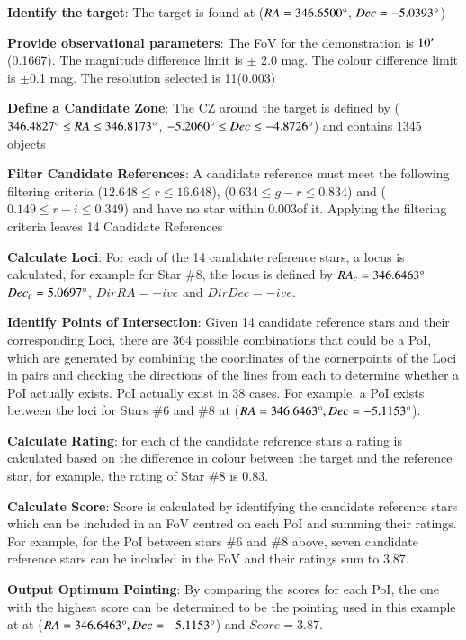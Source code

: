 \documentclass{aa}
\begin{document}
\textbf{Identify the target}: The target is found at (${RA = 346.6500\degree}$, ${Dec =-5.0393\degree}$)

\textbf{Provide observational parameters}: The FoV for the demonstration is $10^\prime$ (0.1667\textdegree). The magnitude difference limit is $\pm$ 2.0 mag. The colour difference limit is $\pm$0.1 mag. The resolution selected is 11\arcsec (0.003\textdegree)

\textbf{Define a Candidate Zone}: The CZ around the target is defined by (${346.4827\degree \leq RA \leq 346.8173\degree{}}$, ${-5.2060\degree \leq Dec \leq -4.8726\degree}$) and contains 1345 objects

\textbf{Filter Candidate References}: A candidate reference must meet the following filtering criteria (${12.648 \leq r \leq 16.648}$), (${0.634 \leq g-r \leq 0.834}$) and (${0.149 \leq r-i \leq 0.349}$) and have no star within 0.003\textdegree of it. Applying the filtering criteria leaves 14 Candidate References

\textbf{Calculate Loci}: For each of the 14 candidate reference stars, a locus is calculated, for example for Star \#{}8, the locus is defined by ${RA_c=346.6463\degree{}}$ ${Dec_c=5.0697\degree{}}$, ${DirRA = -ive}$ and ${DirDec = -ive}$.

\textbf{Identify Points of Intersection}: Given 14 candidate reference stars and their corresponding Loci, there are 364 possible combinations that could be a PoI, which are generated by combining the coordinates of the cornerpoints of the Loci in pairs and checking the directions of the lines from each to determine whether a PoI actually exists.  PoI actually exist in 38 cases. For example, a PoI exists between the loci for Stars \#{}6 and \#{}8 at (${RA=346.6463\degree}, {Dec = -5.1153\degree}$).

\textbf{Calculate Rating}: for each of the candidate reference stars a rating is calculated based on the difference in colour between the target and the reference star, for example, the rating of Star \#{}8 is 0.83.

\textbf{Calculate Score}: Score is calculated by identifying the candidate reference stars which can be included in an FoV centred on each PoI and summing their ratings. For example, for the PoI between stars \#{}6 and \#{}8 above, seven candidate reference stars can be included in the FoV and their ratings sum to 3.87.

\textbf{Output Optimum Pointing}: By comparing the scores for each PoI, the one with the highest score can be determined to be the pointing used in this example at at (${RA=346.6463\degree}, {Dec = -5.1153\degree}$) and ${Score = 3.87}$.
\end{document}
